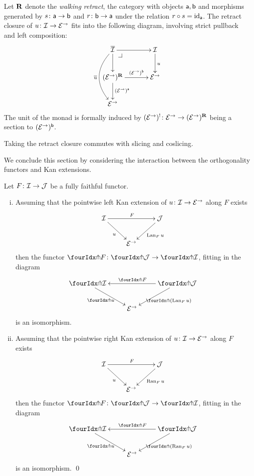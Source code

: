 \documentclass[reqno,10pt,a4paper,oneside]{amsart}
\begin{document}
\begin{remark} Let $\mathbf{R}$ denote the \emph{walking retract}, \ie the category with objects $\mathsf{a}, \mathsf{b}$ and morphisms generated by $s \colon \mathsf{a} \to \mathsf{b}$ and $r \colon \mathsf{b} \to \mathsf{a}$ under the relation $r \mathbin{\circ} s = \operatorname{id}_{\mathsf{a}}$. The retract closure of $u \colon \mathcal{I} \to \mathcal{E}^\to$ fits into the following diagram, involving strict pullback and left composition:
\[
\xymatrix@C+1em{
  \overline{\cal{I}}
  \ar[r]
  \ar[d]
  \ar@/_2em/[dd]_{\overline{u}}
  \pullback{dr}
&
  \cal{I}
  \ar[d]^{u}
\\
  (\catE^{\to})^{\ret}
  \ar[r]^-{(\catE^{\to})^{\retB}}
  \ar[d]^{(\catE^{\to})^{\retA}}
&
  \catE^{\to}
\\
  \catE^{\to}
}
\]
The unit of the monad is formally induced by $(\mathcal{E}^{\to})^{\mathord{!}} \colon \mathcal{E}^{\to} \to (\mathcal{E}^{\to})^{\mathbf{R}}$ being a section to $(\mathcal{E}^{\to})^{\mathsf{b}}$.
\end{remark}


\begin{remark}
\label{retract-closure-slicing}
Taking the retract closure commutes with slicing and coslicing.
\end{remark}

\medskip

We conclude this section by considering the interaction between the orthogonality functors and  Kan extensions.




\begin{proposition} Let $F \colon \mathcal{I} \to \mathcal{J}$ be a fully faithful functor. 
\label{kan-extension-closure}
\begin{enumerate}[(i)]
\item Assuming that the pointwise left Kan extension of 
$u \colon \mathcal{I} \to \mathcal{E}^{\to}$ along $F$ exists
\[
\xymatrix{
  \cal{I}
  \ar[dr]_{u}
  \ar[rr]^{F}
&&
  \cal{J}
  \ar[dl]^{\Lan_F u}
\\&
  \catE^{\to}
}
\]
then the functor $\liftr{F} \co \liftr{\cal{J}} \to \liftr{\cal{I}}$,  fitting in the diagram
\[
\xymatrix{
  \liftr{\cal{I}}
  \ar[dr]_{\liftr{u}}
&&
  \liftr{\cal{J}}
  \ar[ll]_{\liftr{F}}
  \ar[dl]^{\liftr{(\Lan_F u)}}
\\&
  \catE^{\to}
}
\]
is an isomorphism.
\item Assuming that the pointwise right Kan extension of 
$u \colon \mathcal{I} \to \mathcal{E}^{\to}$ along $F$ exists
\[
\xymatrix{
  \cal{I}
  \ar[dr]_{u}
  \ar[rr]^{F}
&&
  \cal{J}
  \ar[dl]^{\Ran_F u}
\\&
  \catE^{\to}
}
\]
then the functor $\liftl{F} \co \liftl{\cal{J}} \to \liftl{\cal{I}}$, fitting in the diagram
\[
\xymatrix{
  \liftl{\cal{I}}
  \ar[dr]_{\liftl{u}}
&&
  \liftl{\cal{J}}
  \ar[ll]_{\liftl{F}}
  \ar[dl]^{\liftl{(\Ran_F u)}}
\\&
  \catE^{\to}
}
\]
is an isomorphism. \qed
\end{enumerate}
\end{proposition}
\end{document}
